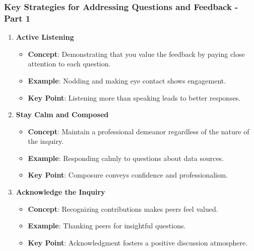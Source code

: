 \documentclass[aspectratio=169]{beamer}
\begin{document}
\begin{frame}[fragile]
    \frametitle{Key Strategies for Addressing Questions and Feedback - Part 1}
    \begin{enumerate}
        \item \textbf{Active Listening}
        \begin{itemize}
            \item \textbf{Concept}: Demonstrating that you value the feedback by paying close attention to each question.
            \item \textbf{Example}: Nodding and making eye contact shows engagement.
            \item \textbf{Key Point}: Listening more than speaking leads to better responses.
        \end{itemize}
        
        \item \textbf{Stay Calm and Composed}
        \begin{itemize}
            \item \textbf{Concept}: Maintain a professional demeanor regardless of the nature of the inquiry.
            \item \textbf{Example}: Responding calmly to questions about data sources.
            \item \textbf{Key Point}: Composure conveys confidence and professionalism.
        \end{itemize}
        
        \item \textbf{Acknowledge the Inquiry}
        \begin{itemize}
            \item \textbf{Concept}: Recognizing contributions makes peers feel valued.
            \item \textbf{Example}: Thanking peers for insightful questions.
            \item \textbf{Key Point}: Acknowledgment fosters a positive discussion atmosphere.
        \end{itemize}
    \end{enumerate}
\end{frame}
\end{document}
